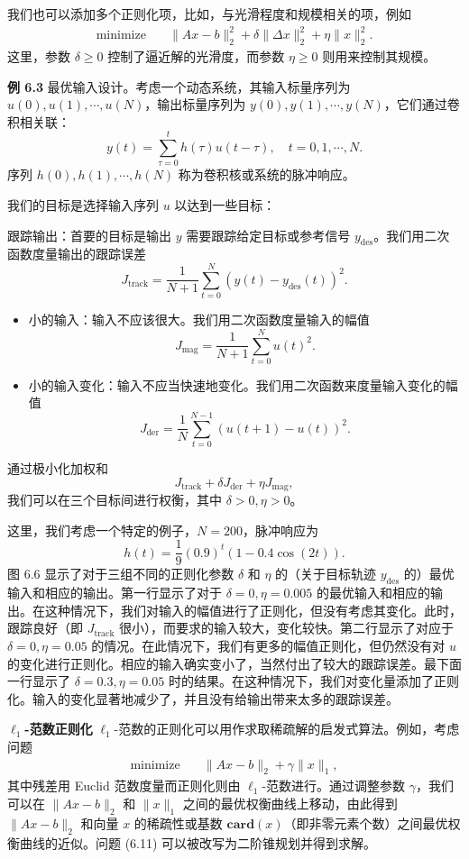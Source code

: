 \documentclass[UTF8, 12pt, fontset=fandol, oneside]{ctexart}
\begin{document}
我们也可以添加多个正则化项，比如，与光滑程度和规模相关的项，例如
\[
\begin{aligned}
\text{minimize}\quad & \|Ax-b\|_2^2+\delta\|\Delta x\|_2^2+\eta\|x\|_2^2.
\end{aligned}
\]
这里，参数 $\delta\geq 0$ 控制了逼近解的光滑度，而参数 $\eta\geq 0$ 则用来控制其规模。

\noindent\textbf{例 6.3}\quad
最优输入设计。考虑一个动态系统，其输入标量序列为 $u(0),u(1),\cdots,u(N)$，输出标量序列为 $y(0),y(1),\cdots,y(N)$，它们通过卷积相关联：
\[
y(t)=\sum_{\tau=0}^t h(\tau)u(t-\tau),\quad t=0,1,\cdots,N.
\]
序列 $h(0),h(1),\cdots,h(N)$ 称为卷积核或系统的脉冲响应。

我们的目标是选择输入序列 $u$ 以达到一些目标：

跟踪输出：首要的目标是输出 $y$ 需要跟踪给定目标或参考信号 $y_{\mathrm{des}}$。我们用二次函数度量输出的跟踪误差
\[
J_{\mathrm{track}}=\frac{1}{N+1}\sum_{t=0}^N (y(t)-y_{\mathrm{des}}(t))^2.
\]

\begin{itemize}
\item 小的输入：输入不应该很大。我们用二次函数度量输入的幅值
\[
J_{\mathrm{mag}}=\frac{1}{N+1}\sum_{t=0}^N u(t)^2.
\]
\item 小的输入变化：输入不应当快速地变化。我们用二次函数来度量输入变化的幅值
\[
J_{\mathrm{der}}=\frac{1}{N}\sum_{t=0}^{N-1}(u(t+1)-u(t))^2.
\]
\end{itemize}

通过极小化加权和
\[
J_{\mathrm{track}}+\delta J_{\mathrm{der}}+\eta J_{\mathrm{mag}},
\]
我们可以在三个目标间进行权衡，其中 $\delta>0,\eta>0$。

这里，我们考虑一个特定的例子，$N=200$，脉冲响应为
\[
h(t)=\frac{1}{9}(0.9)^t(1-0.4\cos(2t)).
\]
图 6.6 显示了对于三组不同的正则化参数 $\delta$ 和 $\eta$ 的（关于目标轨迹 $y_{\mathrm{des}}$ 的）最优输入和相应的输出。第一行显示了对于 $\delta=0,\eta=0.005$ 的最优输入和相应的输出。在这种情况下，我们对输入的幅值进行了正则化，但没有考虑其变化。此时，跟踪良好（即 $J_{\mathrm{track}}$ 很小），而要求的输入较大，变化较快。第二行显示了对应于 $\delta=0,\eta=0.05$ 的情况。在此情况下，我们有更多的幅值正则化，但仍然没有对 $u$ 的变化进行正则化。相应的输入确实变小了，当然付出了较大的跟踪误差。最下面一行显示了 $\delta=0.3,\eta=0.05$ 时的结果。在这种情况下，我们对变化量添加了正则化。输入的变化显著地减少了，并且没有给输出带来太多的跟踪误差。

\noindent\textbf{$\ell_1$-范数正则化}\quad
$\ell_1$-范数的正则化可以用作求取稀疏解的启发式算法。例如，考虑问题
\begin{equation}
\begin{aligned}
\text{minimize}\quad & \|Ax-b\|_2+\gamma\|x\|_1,
\end{aligned}
\tag{6.11}
\end{equation}
其中残差用 Euclid 范数度量而正则化则由 $\ell_1$-范数进行。通过调整参数 $\gamma$，我们可以在 $\|Ax-b\|_2$ 和 $\|x\|_1$ 之间的最优权衡曲线上移动，由此得到 $\|Ax-b\|_2$ 和向量 $x$ 的稀疏性或基数 $\mathbf{card}(x)$（即非零元素个数）之间最优权衡曲线的近似。问题 (6.11) 可以被改写为二阶锥规划并得到求解。
\end{document}
